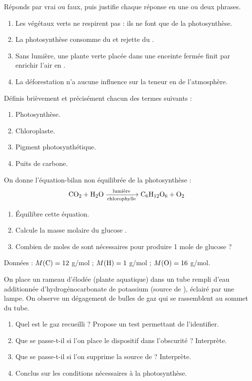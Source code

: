 \documentclass[11pt]{article}
\newcounter{popsec}
\newcounter{popsub}
\newcommand{\courssub}[1]{%
  \stepcounter{popsub}%
  \par\vspace{9pt}\noindent{\popxbold\fontsize{11.5}{13}\selectfont\color{popink}{\color{poporange}\thepopsec.\thepopsub}\hspace{6pt}#1}\par\nopagebreak\vspace{4pt}
}
\begin{document}
\begin{exercice}
Réponds par vrai ou faux, puis justifie chaque réponse en une ou deux phrases.
\begin{enumerate}
\item Les végétaux verts ne respirent pas : ils ne font que de la photosynthèse.
\item La photosynthèse consomme du  et rejette du .
\item Sans lumière, une plante verte placée dans une enceinte fermée finit par enrichir l'air en .
\item La déforestation n'a aucune influence sur la teneur en  de l'atmosphère.
\end{enumerate}
\end{exercice}

\begin{exercice}
Définis brièvement et précisément chacun des termes suivants :
\begin{enumerate}
\item Photosynthèse.
\item Chloroplaste.
\item Pigment photosynthétique.
\item Puits de carbone.
\end{enumerate}
\end{exercice}

\begin{exercice}
On donne l'équation-bilan non équilibrée de la photosynthèse :
\[ \ce{CO2 + H2O ->[$\text{lumière}$][\text{chlorophylle}] C6H12O6 + O2} \]
\begin{enumerate}
\item Équilibre cette équation.
\item Calcule la masse molaire du glucose .
\item Combien de moles de  sont nécessaires pour produire 1 mole de glucose ?
\end{enumerate}
Données : $M(\ce{C}) = 12$ g/mol ; $M(\ce{H}) = 1$ g/mol ; $M(\ce{O}) = 16$ g/mol.
\end{exercice}

\courssub{Je m'entraîne}

\begin{exercice}
On place un rameau d'élodée (plante aquatique) dans un tube rempli d'eau additionnée d'hydrogénocarbonate de potassium (source de ), éclairé par une lampe. On observe un dégagement de bulles de gaz qui se rassemblent au sommet du tube.
\begin{enumerate}
\item Quel est le gaz recueilli ? Propose un test permettant de l'identifier.
\item Que se passe-t-il si l'on place le dispositif dans l'obscurité ? Interprète.
\item Que se passe-t-il si l'on supprime la source de  ? Interprète.
\item Conclus sur les conditions nécessaires à la photosynthèse.
\end{enumerate}
\end{exercice}
\end{document}
